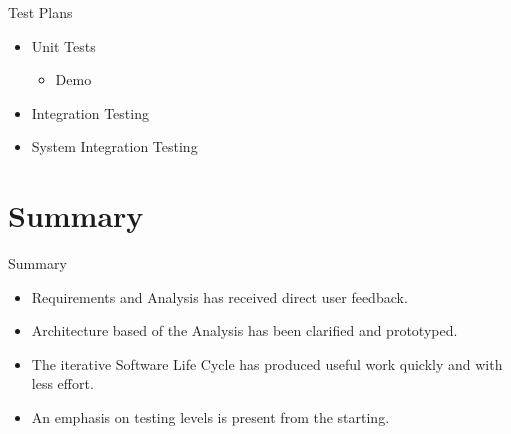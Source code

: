 \documentclass{beamer}
\begin{document}
\begin{frame}{Test Plans}
\begin{itemize}
\item Unit Tests
\begin{itemize}
\item Demo
\end{itemize}
\item Integration Testing
\item System Integration Testing
\end{itemize}
\end{frame}





\section*{Summary}

\begin{frame}{Summary}

\begin{itemize}
\item
Requirements and Analysis has received direct user feedback.
\item
Architecture based of the Analysis has been clarified and prototyped. 
\item 
The iterative Software Life Cycle has produced useful work quickly and with less effort.
\item
An emphasis on testing levels is present from the starting.
\end{itemize}
\end{frame}
\end{document}
